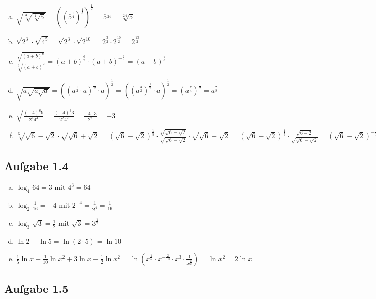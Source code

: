 \documentclass{standalone}
\begin{document}
\begin{enumerate}[a)]
    \item $\sqrt{\sqrt[3]{\sqrt[4]{5}}} = ((5^\frac{1}{4})^\frac{1}{3})^\frac{1}{2} = 5^\frac{1}{24} = \sqrt[24]{5}$
    \item $\sqrt{2^3} \cdot \sqrt{4^5} = \sqrt{2^3} \cdot \sqrt{2^{10}} = 2^{\frac{3}{2}} \cdot 2^{\frac{10}{2}} = 2^{\frac{13}{2}} $
    \item $\frac{\sqrt{(a+b)^6}}{\sqrt[3]{(a+b)^2}} = (a+b)^{\frac{6}{2}} \cdot (a+b)^{-\frac{2}{3}} = 
    (a+b)^{\frac{7}{3}}$
    \item $\sqrt{a\sqrt{a\sqrt{a}}} = ((a^{\frac{1}{2}} \cdot a)^{\frac{1}{2}} \cdot a)^{\frac{1}{2}} = 
    ((a^{\frac{3}{2}})^{\frac{1}{2}} \cdot a)^{\frac{1}{2}} = (a^{\frac{7}{4}})^{\frac{1}{2}} = 
    a^{\frac{7}{8}}$
    \item $\sqrt{\frac{{(-4)^6 9}}{2^4 4^4}} = \frac{(-4)^3 3}{2^2 4^2} = \frac{-4 \cdot 3}{2^2} = -3$
    \item $\sqrt[5]{\sqrt{6} - \sqrt{2}} \cdot \sqrt{\sqrt{6}+ \sqrt{2}} = 
    (\sqrt{6}-\sqrt{2})^\frac{1}{5} \cdot \frac{\sqrt{\sqrt{6}- \sqrt2}}{\sqrt{\sqrt{6}- \sqrt2}} \cdot \sqrt{\sqrt{6} + \sqrt{2}} =
    (\sqrt{6}-\sqrt{2})^\frac{1}{5} \cdot \frac{\sqrt{6-2}}{\sqrt{\sqrt{6}-\sqrt{2}}} =
    (\sqrt{6}-\sqrt{2})^{-\frac{3}{10}} \cdot 2$
\end{enumerate}

\subsection{Aufgabe 1.4}

\begin{enumerate}[a)]
    \item $\log_4 64 = 3$ mit $4^3 = 64$
    \item $\log_2 \frac{1}{16} = -4$ mit $2^{-4} = \frac{1}{2^4} = \frac{1}{16}$
    \item $\log_3 \sqrt{3} = \frac{1}{2}$ mit $\sqrt{3} = 3^{\frac{1}{2}}$
    \item $\ln 2 + \ln 5 = \ln (2 \cdot 5) = \ln 10$
    \item $\frac{1}{5} \ln x - \frac{1}{10} \ln x^2 + 3 \ln x - \frac{1}{2} \ln x^2  = 
    \ln (x^{\frac{1}{5}} \cdot x^{-\frac{2}{10}} \cdot x^3 \cdot \frac{1}{x^\frac{2}{2}}) = 
    \ln {x^2} = 2\ln x$
\end{enumerate}

\subsection{Aufgabe 1.5}
\end{document}
